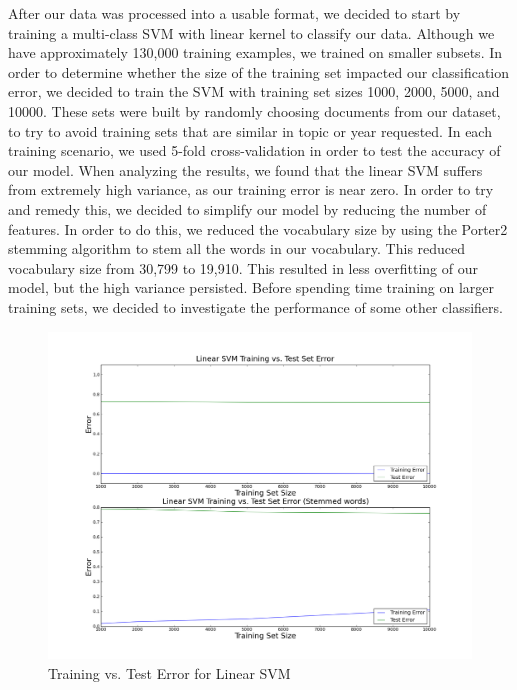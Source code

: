 \documentclass{sig-alternate}
\begin{document}
After our data was processed into a usable format, we decided to start by training a multi-class SVM with linear kernel to classify our data.  Although we have approximately 130,000 training examples, we trained on smaller subsets.  In order to determine whether the size of the training set impacted our classification error, we decided to train the SVM with training set sizes 1000, 2000, 5000, and 10000.  These sets were built by randomly choosing documents from our dataset, to try to avoid training sets that are similar in topic or year requested.  In each training scenario, we used 5-fold cross-validation in order to test the accuracy of our model.  When analyzing the results, we found that the linear SVM suffers from extremely high variance, as our training error is near zero.  In order to try and remedy this, we decided to simplify our model by reducing the number of features.  In order to do this, we reduced the vocabulary size by using the Porter2 stemming algorithm to stem all the words in our vocabulary.  This reduced vocabulary size from 30,799 to 19,910.  This resulted in less overfitting of our model, but the high variance persisted.  Before spending time training on larger training sets, we decided to investigate the performance of some other classifiers. \\

\begin{figure}[h]
\centering
\includegraphics[width=150mm]{linsvm_train_vs_test_both.png}
\caption{Training vs. Test Error for Linear SVM}
\end{figure}
\end{document}
